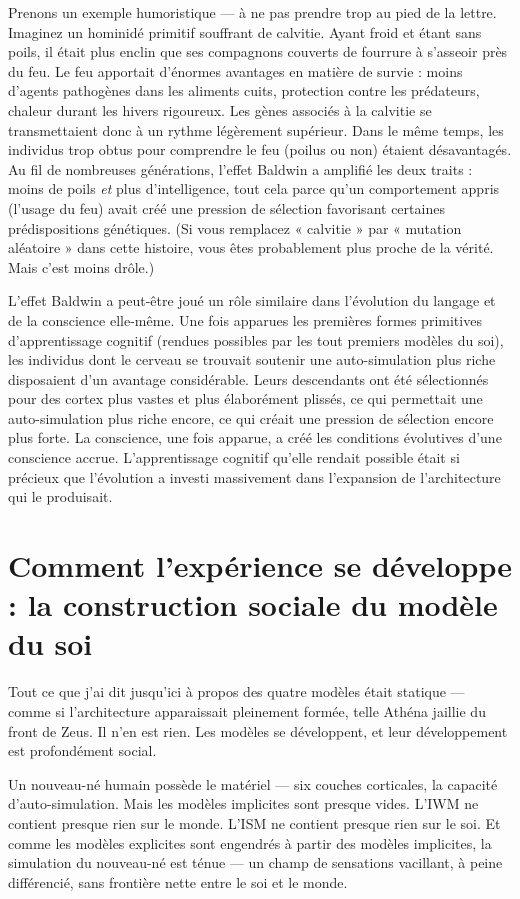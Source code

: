 \documentclass[11pt, twoside, openright]{book}
\begin{document}
Prenons un exemple humoristique --- à ne pas prendre trop au pied de la lettre. Imaginez un hominidé primitif souffrant de calvitie. Ayant froid et étant sans poils, il était plus enclin que ses compagnons couverts de fourrure à s'asseoir près du feu. Le feu apportait d'énormes avantages en matière de survie : moins d'agents pathogènes dans les aliments cuits, protection contre les prédateurs, chaleur durant les hivers rigoureux. Les gènes associés à la calvitie se transmettaient donc à un rythme légèrement supérieur. Dans le même temps, les individus trop obtus pour comprendre le feu (poilus ou non) étaient désavantagés. Au fil de nombreuses générations, l'effet Baldwin a amplifié les deux traits : moins de poils \textit{et} plus d'intelligence, tout cela parce qu'un comportement appris (l'usage du feu) avait créé une pression de sélection favorisant certaines prédispositions génétiques. (Si vous remplacez « calvitie » par « mutation aléatoire » dans cette histoire, vous êtes probablement plus proche de la vérité. Mais c'est moins drôle.)

L'effet Baldwin a peut-être joué un rôle similaire dans l'évolution du langage et de la conscience elle-même. Une fois apparues les premières formes primitives d'apprentissage cognitif (rendues possibles par les tout premiers modèles du soi), les individus dont le cerveau se trouvait soutenir une auto-simulation plus riche disposaient d'un avantage considérable. Leurs descendants ont été sélectionnés pour des cortex plus vastes et plus élaborément plissés, ce qui permettait une auto-simulation plus riche encore, ce qui créait une pression de sélection encore plus forte. La conscience, une fois apparue, a créé les conditions évolutives d'une conscience accrue. L'apprentissage cognitif qu'elle rendait possible était si précieux que l'évolution a investi massivement dans l'expansion de l'architecture qui le produisait.

\section*{Comment l'expérience se développe : la construction sociale du modèle du soi}

Tout ce que j'ai dit jusqu'ici à propos des quatre modèles était statique --- comme si l'architecture apparaissait pleinement formée, telle Athéna jaillie du front de Zeus. Il n'en est rien. Les modèles se développent, et leur développement est profondément social.

Un nouveau-né humain possède le matériel --- six couches corticales, la capacité d'auto-simulation. Mais les modèles implicites sont presque vides. L'IWM ne contient presque rien sur le monde. L'ISM ne contient presque rien sur le soi. Et comme les modèles explicites sont engendrés à partir des modèles implicites, la simulation du nouveau-né est ténue --- un champ de sensations vacillant, à peine différencié, sans frontière nette entre le soi et le monde.
\end{document}
